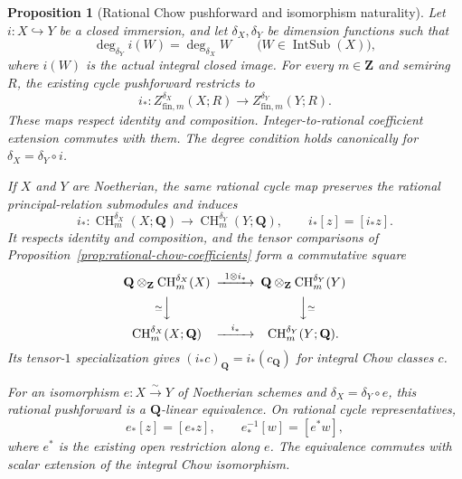 \documentclass[11pt]{article}
\newtheorem{proposition}[theorem]{Proposition}
\theoremstyle{definition}
\theoremstyle{remark}
\begin{document}
\begin{proposition}[Rational Chow pushforward and isomorphism naturality]
\label{prop:rational-chow-naturality}
Let \(i:X\hookrightarrow Y\) be a closed immersion, and let
\(\delta_X,\delta_Y\) be dimension functions such that
\[
 \deg_{\delta_Y}i(W)=\deg_{\delta_X}W
       \qquad\bigl(W\in\operatorname{IntSub}(X)\bigr),
\]
where \(i(W)\) is the actual integral closed image.
For every \(m\in\mathbf Z\) and semiring \(R\), the existing cycle pushforward restricts to
\[
 i_*:Z^{\delta_X}_{\mathrm{fin},m}(X;R)
       \longrightarrow Z^{\delta_Y}_{\mathrm{fin},m}(Y;R).
\]
These maps respect identity and composition. Integer-to-rational
coefficient extension commutes with them. The degree condition
holds canonically for \(\delta_X=\delta_Y\circ i\).

If \(X\) and \(Y\) are Noetherian, the same rational cycle map
preserves the rational principal-relation submodules and induces
\[
 i_*:\operatorname{CH}_m^{\delta_X}(X;\mathbf Q)
       \longrightarrow\operatorname{CH}_m^{\delta_Y}(Y;\mathbf Q),
 \qquad i_*[z]=[i_*z].
\]
It respects identity and composition, and the tensor comparisons of
Proposition~\ref{prop:rational-chow-coefficients} form a commutative square
\[
\begin{CD}
 \mathbf Q\otimes_{\mathbf Z}\operatorname{CH}_m^{\delta_X}(X)
   @>{1\otimes i_*}>>
 \mathbf Q\otimes_{\mathbf Z}\operatorname{CH}_m^{\delta_Y}(Y)\\
 @V{\simeq}VV @VV{\simeq}V\\
 \operatorname{CH}_m^{\delta_X}(X;\mathbf Q)
   @>{i_*}>> \operatorname{CH}_m^{\delta_Y}(Y;\mathbf Q).
\end{CD}
\]
Its tensor-\(1\) specialization gives
\((i_*c)_{\mathbf Q}=i_*(c_{\mathbf Q})\) for integral Chow classes \(c\).

For an isomorphism \(e:X\xrightarrow{\sim}Y\) of Noetherian schemes and
\(\delta_X=\delta_Y\circ e\), this rational pushforward is a
\(\mathbf Q\)-linear equivalence. On rational cycle representatives,
\[
 e_*[z]=[e_*z],\qquad e_*^{-1}[w]=[e^*w],
\]
where \(e^*\) is the existing open restriction along \(e\).
The equivalence commutes with scalar extension of the integral
Chow isomorphism.
\end{proposition}
\end{document}
